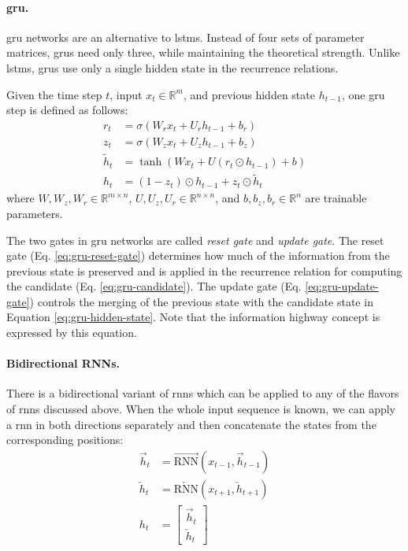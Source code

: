 \paragraph{\acs{gru}.} \acl{gru} networks \citep{cho-etal-2014-properties} are
an alternative to \acp{lstm}. Instead of four sets of parameter matrices,
\acp{gru} need only three, while maintaining the theoretical strength. Unlike
\acp{lstm}, \acp{gru} use only a single hidden state in the recurrence
relations.

Given the time step $t$, input $x_t \in \mathbb{R}^m$, and previous hidden
state $h_{t-1}$, one \ac{gru} step is defined as follows:
%
\begin{align}
  r_t &= \sigma\left(W_r x_t + U_r h_{t-1} + b_r\right) \label{eq:gru-reset-gate} \\
  z_t &= \sigma\left(W_z x_t + U_z h_{t-1} + b_z\right) \label{eq:gru-update-gate} \\
  \tilde{h}_t &= \tanh \left(W x_t + U \left( r_t \odot h_{t-1} \right) + b \right) \label{eq:gru-candidate} \\
  h_t &= (1 - z_t) \odot h_{t-1} + z_t \odot \tilde{h}_t \label{eq:gru-hidden-state}
\end{align}
%
where $W, W_z, W_r \in \mathbb{R}^{m\times n}$,
$U, U_z, U_r \in \mathbb{R}^{n \times n}$, and $b, b_z, b_r \in \mathbb{R}^n$
are trainable parameters.

The two gates in \ac{gru} networks are called \emph{reset gate} and
\emph{update gate}.  The reset gate (Eq. \ref{eq:gru-reset-gate}) determines
how much of the information from the previous state is preserved and is applied
in the recurrence relation for computing the candidate
(Eq. \ref{eq:gru-candidate}). The update gate (Eq.  \ref{eq:gru-update-gate})
controls the merging of the previous state with the candidate state in Equation
\ref{eq:gru-hidden-state}. Note that the information highway concept is
expressed by this equation.

\paragraph{Bidirectional RNNs.} There is a bidirectional variant of \acp{rnn}
which can be applied to any of the flavors of \acp{rnn} discussed above. When
the whole input sequence is known, we can apply a \ac{rnn} in both directions
separately and then concatenate the states from the corresponding positions:
%
\begin{align}
  \overrightarrow{h}_t &= \overrightarrow{\mathrm{RNN}}(x_{t-1}, \overrightarrow{h}_{t-1}) \\
  \overleftarrow{h}_t &= \overleftarrow{\mathrm{RNN}}(x_{t+1}, \overleftarrow{h}_{t+1}) \\
  h_t &= \left[ \begin{matrix} \overrightarrow{h}_t \\ \overleftarrow{h}_t \end{matrix} \right]
\end{align}

